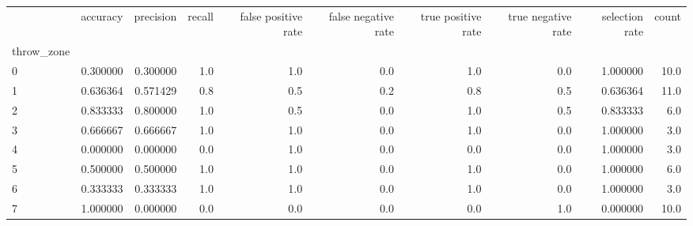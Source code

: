 \begin{tabular}{lrrrrrrrrr}
\toprule
{} &  accuracy &  precision &  recall &  false positive rate &  false negative rate &  true positive rate &  true negative rate &  selection rate &  count \\
throw\_zone &           &            &         &                      &                      &                     &                     &                 &        \\
\midrule
0          &  0.300000 &   0.300000 &     1.0 &                  1.0 &                  0.0 &                 1.0 &                 0.0 &        1.000000 &   10.0 \\
1          &  0.636364 &   0.571429 &     0.8 &                  0.5 &                  0.2 &                 0.8 &                 0.5 &        0.636364 &   11.0 \\
2          &  0.833333 &   0.800000 &     1.0 &                  0.5 &                  0.0 &                 1.0 &                 0.5 &        0.833333 &    6.0 \\
3          &  0.666667 &   0.666667 &     1.0 &                  1.0 &                  0.0 &                 1.0 &                 0.0 &        1.000000 &    3.0 \\
4          &  0.000000 &   0.000000 &     0.0 &                  1.0 &                  0.0 &                 0.0 &                 0.0 &        1.000000 &    3.0 \\
5          &  0.500000 &   0.500000 &     1.0 &                  1.0 &                  0.0 &                 1.0 &                 0.0 &        1.000000 &    6.0 \\
6          &  0.333333 &   0.333333 &     1.0 &                  1.0 &                  0.0 &                 1.0 &                 0.0 &        1.000000 &    3.0 \\
7          &  1.000000 &   0.000000 &     0.0 &                  0.0 &                  0.0 &                 0.0 &                 1.0 &        0.000000 &   10.0 \\
\bottomrule
\end{tabular}
